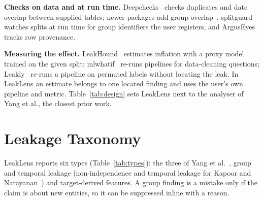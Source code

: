 \documentclass[10pt,a4paper,twocolumn]{article}
\newcommand{\tool}{LeakLens}
\begin{document}
\textbf{Checks on data and at run time.} Deepchecks~\cite{chorev2022} checks duplicates and date overlap between
supplied tables; newer packages add group overlap~\cite{leakcheckml,leakhound,dataleaks}. splitguard~\cite{splitguard}
watches splits at run time for group identifiers the user registers, and ArgusEyes~\cite{schelter2023} tracks row
provenance.

\textbf{Measuring the effect.} LeakHound~\cite{leakhound} estimates inflation with a proxy model trained on the
given split; mlwhatif~\cite{grafberger2023} re-runs pipelines for data-cleaning questions; Leakly~\cite{leakly}
re-runs a pipeline on permuted labels without locating the leak. In \tool{} an estimate
belongs to one located finding and uses the user's own pipeline and metric. Table~\ref{tab:design} sets \tool{}
next to the analyser of Yang et al., the closest prior work.

\begin{table}[t]
\caption{Design comparison between the static analyser of Yang et al.\ and \tool{}. Entries for Yang et al.\
come from their paper and our runs of their released tool. The two accuracy rows were measured on different data
with different labelling and are not comparable; Table~\ref{tab:yang} is the like-for-like measurement.}
\label{tab:design}
\footnotesize

\end{table}

\section{Leakage Taxonomy}

\tool{} reports six types (Table~\ref{tab:types}): the three of Yang et al.~\cite{yang2022}, group and temporal
leakage (non-independence and temporal leakage for Kapoor and Narayanan~\cite{kapoor2023}) and target-derived
features. A group finding is a mistake only if the claim is about new entities, so it
can be suppressed inline with a reason.
\end{document}
